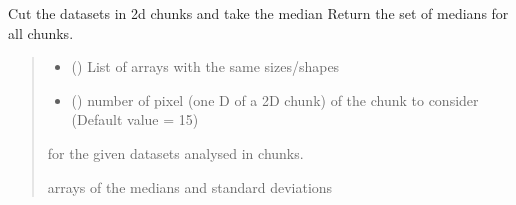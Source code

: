 \documentclass[letterpaper,10pt,english]{sphinxmanual}
\begin{document}
\begin{fulllineitems}
\label{\detokenize{api/pymusepipe:pymusepipe.util_image.chunk_stats}}
\pysigstartsignatures
{}
\pysigstopsignatures
\sphinxAtStartPar
Cut the datasets in 2d chunks and take the median
Return the set of medians for all chunks.
\begin{quote}\begin{description}
\begin{itemize}
\item {} 
\sphinxAtStartPar
{} () \textendash{} List of arrays with the same sizes/shapes

\item {} 
\sphinxAtStartPar
{} () \textendash{} number of pixel (one D of a 2D chunk)
of the chunk to consider (Default value = 15)

\end{itemize}

\sphinxAtStartPar
{} \textendash{} for the given datasets analysed in chunks.

 arrays of the medians and standard deviations

\end{description}\end{quote}

\end{fulllineitems}

\end{document}
